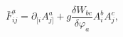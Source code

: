 \begin{equation}
\bar{F}_{ij}^{a}=\partial _{[i}A_{j]}^{a}+g\frac{\delta W_{bc}}{\delta
\varphi _{a}}A_{i}^{b}A_{j}^{c},  \label{i7}
\end{equation}

